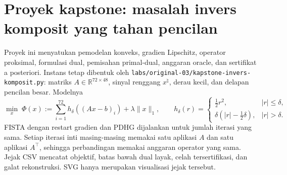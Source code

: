 
\section{Proyek kapstone: masalah invers komposit yang tahan pencilan}
\label{orig03:capstone:invers-komposit}
\label{orig03:capstone:unit}

Proyek ini menyatukan pemodelan konveks, gradien Lipschitz, operator
proksimal, formulasi dual, pemisahan primal-dual, anggaran oracle, dan
sertifikat a posteriori. Instans tetap dibentuk oleh
\texttt{labs/original-03/kapstone-invers-komposit.py}: matriks
$A\in\mathbb{R}^{72\times48}$, sinyal renggang $x^\natural$, derau kecil,
dan delapan pencilan besar. Modelnya
\begin{equation}
 \min_x\; \Phi(x):=
 \sum_{i=1}^{72}h_\delta((Ax-b)_i)+\lambda\|x\|_1,
 \qquad
 h_\delta(r)=
 \begin{cases}
   \frac12r^2,&|r|\leq\delta,\\
   \delta(|r|-\frac12\delta),&|r|>\delta.
 \end{cases}
 \label{orig03:eq:capstone-model}
\end{equation}
FISTA dengan restart gradien dan PDHG dijalankan untuk jumlah iterasi yang sama.
Setiap iterasi inti masing-masing memakai satu aplikasi $A$ dan satu aplikasi
$A^\top$, sehingga perbandingan memakai anggaran operator yang sama. Jejak
CSV mencatat objektif, batas bawah dual layak, celah tersertifikasi, dan galat
rekonstruksi. SVG hanya merupakan visualisasi jejak tersebut.

